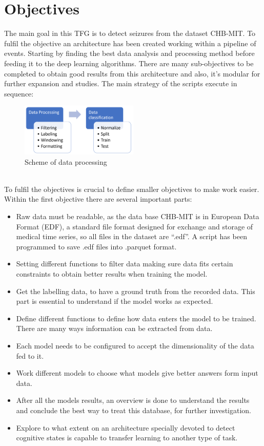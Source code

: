 \section{Objectives}
\label{sec-objectives}
The main goal in this TFG is to detect seizures from the dataset CHB-MIT. To fulfil the objective an architecture has been created working within a pipeline of events. Starting by finding the best data analysis and processing method before feeding it to the deep learning algorithms. There are many sub-objectives to be completed to obtain good results from this architecture and also, it’s modular for further expansion and studies. The main strategy of the scripts execute in sequence:
\\
\begin{figure}[h!]
    \caption{Scheme of data processing }
    \centering
    \includegraphics[width=0.5\textwidth]{img/pipeline.png}
\end{figure}
\\
To fulfil the objectives is crucial to define smaller objectives to make work easier. Within the first objective there are several important parts: 
\\
\begin{itemize}

    \item Raw data must be readable, as the data base CHB-MIT\cite{goldberger2000physiobank} is in European Data Format (EDF), a standard file format designed for exchange and storage of medical time series, so all files in the dataset are “.edf”. A script has been programmed to save .edf files into .parquet format.
    \item Setting different functions to filter data making sure data fits certain constraints to obtain better results when training the model.
    \item Get the labelling data, to have a ground truth from the recorded data. This part is essential to understand if the model works as expected.
    \item Define different functions to define how data enters the model to be trained. There are many ways information can be extracted from data. 
    \item Each model needs to be configured to accept the dimensionality of the data fed to it.
    \item Work different models to choose what models give better answers form input data.
    \item After all the models results, an overview is done to understand the results and conclude the best way to treat this database, for further investigation.
    \item Explore to what extent on an architecture specially devoted to detect cognitive states is capable to transfer learning to another type of task.

\end{itemize}
